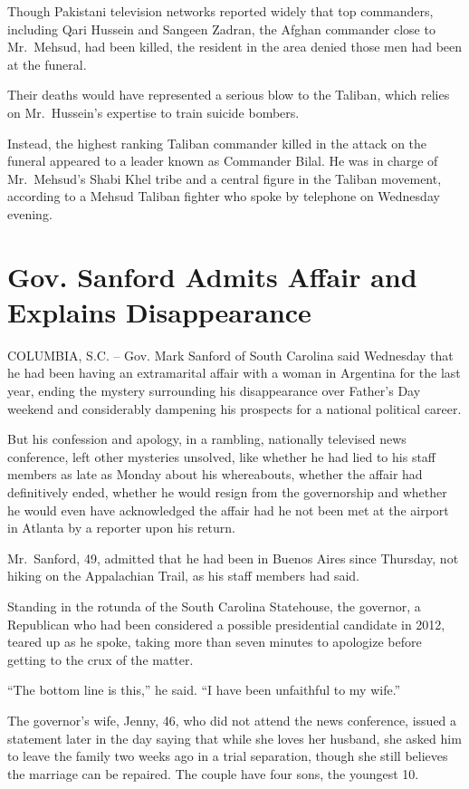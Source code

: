﻿\documentclass[12pt]{article}
\begin{document}
Though Pakistani television networks reported widely that top commanders, including Qari Hussein and
Sangeen Zadran, the Afghan commander close to Mr.~Mehsud, had been killed, the resident in the area
denied those men had been at the funeral.

Their deaths would have represented a serious blow to the Taliban, which relies on Mr.~Hussein's
expertise to train suicide bombers.

Instead, the highest ranking Taliban commander killed in the attack on the funeral appeared to a
leader known as Commander Bilal. He was in charge of Mr.~Mehsud's Shabi Khel tribe and a central figure in the Taliban movement, according to a Mehsud Taliban fighter who spoke by telephone on Wednesday evening.

\section{Gov. Sanford Admits Affair and Explains Disappearance}

COLUMBIA, S.C. -- Gov. Mark Sanford of South Carolina said Wednesday that he had been having an
extramarital affair with a woman in Argentina for the last year, ending the mystery surrounding his
disappearance over Father's Day weekend and considerably dampening his prospects for a national
political career.

But his confession and apology, in a rambling, nationally televised news conference, left other
mysteries unsolved, like whether he had lied to his staff members as late as Monday about his
whereabouts, whether the affair had definitively ended, whether he would resign from the
governorship and whether he would even have acknowledged the affair had he not been met at the
airport in Atlanta by a reporter upon his return.

Mr.~Sanford, 49, admitted that he had been in Buenos Aires since Thursday, not hiking on the
Appalachian Trail, as his staff members had said.

Standing in the rotunda of the South Carolina Statehouse, the governor, a Republican who had been
considered a possible presidential candidate in 2012, teared up as he spoke, taking more than seven
minutes to apologize before getting to the crux of the matter.

``The bottom line is this,'' he said. ``I have been unfaithful to my wife.''

The governor's wife, Jenny, 46, who did not attend the news conference, issued a statement later in
the day saying that while she loves her husband, she asked him to leave the family two weeks ago in
a trial separation, though she still believes the marriage can be repaired. The couple have four
sons, the youngest 10.
\end{document}
